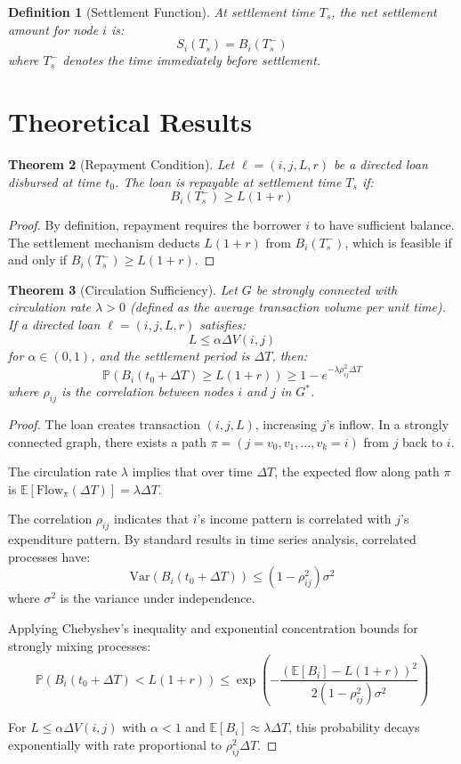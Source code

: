 \documentclass[12pt]{article}
\newtheorem{theorem}{Theorem}
\newtheorem{definition}[theorem]{Definition}
\begin{document}
\begin{definition}[Settlement Function]
At settlement time $T_s$, the net settlement amount for node $i$ is:
$$
S_i(T_s) = B_i(T_s^-)
$$
where $T_s^-$ denotes the time immediately before settlement.
\end{definition}

\section{Theoretical Results}

\begin{theorem}[Repayment Condition]
Let $\ell = (i,j,L,r)$ be a directed loan disbursed at time $t_0$. The loan is repayable at settlement time $T_s$ if:
$$
B_i(T_s^-) \geq L(1+r)
$$
\end{theorem}

\begin{proof}
By definition, repayment requires the borrower $i$ to have sufficient balance. The settlement mechanism deducts $L(1+r)$ from $B_i(T_s^-)$, which is feasible if and only if $B_i(T_s^-) \geq L(1+r)$.
\end{proof}

\begin{theorem}[Circulation Sufficiency]
Let $G$ be strongly connected with circulation rate $\lambda > 0$ (defined as the average transaction volume per unit time). If a directed loan $\ell = (i,j,L,r)$ satisfies:
$$
L \leq \alpha \Delta V(i,j)
$$
for $\alpha \in (0,1)$, and the settlement period is $\Delta T$, then:
$$
\mathbb{P}(B_i(t_0 + \Delta T) \geq L(1+r)) \geq 1 - e^{-\lambda \rho_{ij}^2 \Delta T}
$$
where $\rho_{ij}$ is the correlation between nodes $i$ and $j$ in $G^*$.
\end{theorem}

\begin{proof}
The loan creates transaction $(i,j,L)$, increasing $j$'s inflow. In a strongly connected graph, there exists a path $\pi = (j = v_0, v_1, \ldots, v_k = i)$ from $j$ back to $i$. 

The circulation rate $\lambda$ implies that over time $\Delta T$, the expected flow along path $\pi$ is $\mathbb{E}[\text{Flow}_\pi(\Delta T)] = \lambda \Delta T$.

The correlation $\rho_{ij}$ indicates that $i$'s income pattern is correlated with $j$'s expenditure pattern. By standard results in time series analysis, correlated processes have:
$$
\text{Var}(B_i(t_0 + \Delta T)) \leq (1-\rho_{ij}^2) \sigma^2
$$
where $\sigma^2$ is the variance under independence.

Applying Chebyshev's inequality and exponential concentration bounds for strongly mixing processes:
$$
\mathbb{P}(B_i(t_0 + \Delta T) < L(1+r)) \leq \exp\left(-\frac{(\mathbb{E}[B_i] - L(1+r))^2}{2(1-\rho_{ij}^2)\sigma^2}\right)
$$

For $L \leq \alpha \Delta V(i,j)$ with $\alpha < 1$ and $\mathbb{E}[B_i] \approx \lambda \Delta T$, this probability decays exponentially with rate proportional to $\rho_{ij}^2 \Delta T$.
\end{proof}
\end{document}
